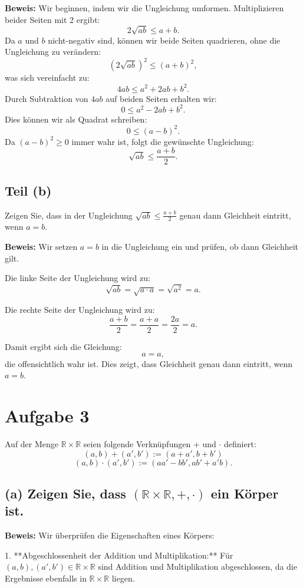 \documentclass[11pt]{article}
\begin{document}
\textbf{Beweis:} Wir beginnen, indem wir die Ungleichung umformen. Multiplizieren beider Seiten mit 2 ergibt:
\[
2\sqrt{ab} \leq a + b.
\]
Da \( a \) und \( b \) nicht-negativ sind, können wir beide Seiten quadrieren, ohne die Ungleichung zu verändern:
\[
(2\sqrt{ab})^2 \leq (a + b)^2,
\]
was sich vereinfacht zu:
\[
4ab \leq a^2 + 2ab + b^2.
\]
Durch Subtraktion von \( 4ab \) auf beiden Seiten erhalten wir:
\[
0 \leq a^2 - 2ab + b^2.
\]
Dies können wir als Quadrat schreiben:
\[
0 \leq (a - b)^2.
\]
Da \( (a - b)^2 \geq 0 \) immer wahr ist, folgt die gewünschte Ungleichung:
\[
\sqrt{ab} \leq \frac{a + b}{2}.
\]

\subsection*{Teil (b)}
Zeigen Sie, dass in der Ungleichung \( \sqrt{ab} \leq \frac{a + b}{2} \) genau dann Gleichheit eintritt, wenn \( a = b \).

\textbf{Beweis:} Wir setzen \( a = b \) in die Ungleichung ein und prüfen, ob dann Gleichheit gilt.

Die linke Seite der Ungleichung wird zu:
\[
\sqrt{ab} = \sqrt{a \cdot a} = \sqrt{a^2} = a.
\]

Die rechte Seite der Ungleichung wird zu:
\[
\frac{a + b}{2} = \frac{a + a}{2} = \frac{2a}{2} = a.
\]

Damit ergibt sich die Gleichung:
\[
a = a,
\]
die offensichtlich wahr ist. Dies zeigt, dass Gleichheit genau dann eintritt, wenn \( a = b \).

   \section*{Aufgabe 3}

Auf der Menge \( \mathbb{R} \times \mathbb{R} \) seien folgende Verknüpfungen \( + \) und \( \cdot \) definiert:
\[
(a, b) + (a', b') := (a + a', b + b')
\]
\[
(a, b) \cdot (a', b') := (aa' - bb', ab' + a'b).
\]

\subsection*{(a) Zeigen Sie, dass \( (\mathbb{R} \times \mathbb{R}, +, \cdot) \) ein Körper ist.}

\textbf{Beweis:} Wir überprüfen die Eigenschaften eines Körpers:

1. **Abgeschlossenheit der Addition und Multiplikation:** Für \( (a, b), (a', b') \in \mathbb{R} \times \mathbb{R} \) sind Addition und Multiplikation abgeschlossen, da die Ergebnisse ebenfalls in \( \mathbb{R} \times \mathbb{R} \) liegen.
\end{document}
